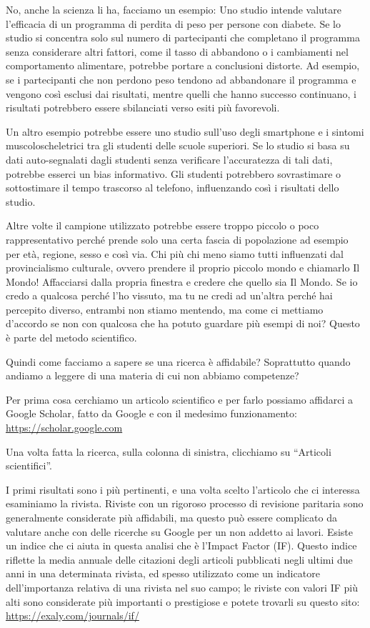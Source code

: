 \documentclass[12pt]{book} %
\begin{document}
No, anche la scienza li ha, facciamo un esempio: Uno studio intende valutare l'efficacia di un
programma di perdita di peso per persone con diabete. Se lo studio si concentra solo sul numero di partecipanti che
completano il programma senza considerare altri fattori, come il tasso di abbandono o i cambiamenti nel comportamento
alimentare, potrebbe portare a conclusioni distorte. Ad esempio, se i partecipanti che non perdono peso tendono ad
abbandonare il programma e vengono così esclusi dai risultati, mentre quelli che hanno successo continuano, i risultati
potrebbero essere sbilanciati verso esiti più favorevoli.

Un altro esempio potrebbe essere uno studio sull'uso degli smartphone e i sintomi
muscoloscheletrici tra gli studenti delle scuole superiori. Se lo studio si basa su dati auto-segnalati dagli studenti
senza verificare l'accuratezza di tali dati, potrebbe esserci un bias informativo. Gli studenti
potrebbero sovrastimare o sottostimare il tempo trascorso al telefono, influenzando così i risultati dello studio.

Altre volte il campione utilizzato potrebbe essere troppo piccolo o poco rappresentativo perché prende solo una certa fascia di popolazione ad esempio per età, regione, sesso e così via. Chi più chi meno siamo tutti influenzati dal provincialismo culturale, ovvero prendere il proprio piccolo mondo e chiamarlo Il Mondo! Affacciarsi dalla propria finestra e credere che quello sia Il Mondo. Se io credo a qualcosa perché l'ho vissuto, ma tu ne credi ad un'altra perché hai percepito diverso, entrambi non stiamo mentendo, ma come ci mettiamo d'accordo se non con qualcosa che ha potuto guardare più esempi di noi? Questo è parte del metodo scientifico.

Quindi come facciamo a sapere se una ricerca è affidabile? Soprattutto quando andiamo a leggere di una materia di cui
non abbiamo competenze?

Per prima cosa cerchiamo un articolo scientifico e per farlo possiamo affidarci a Google Scholar, fatto da Google e con
il medesimo funzionamento: \url{https://scholar.google.com}

Una volta fatta la ricerca, sulla colonna di sinistra, clicchiamo su “Articoli scientifici”.

I primi risultati sono i più pertinenti, e una volta scelto l'articolo che ci interessa esaminiamo
la rivista. Riviste con un rigoroso processo di revisione paritaria sono generalmente considerate più affidabili, ma
questo può essere complicato da valutare anche con delle ricerche su Google per un non addetto ai lavori. Esiste un
indice che ci aiuta in questa analisi che è l'Impact Factor (IF). Questo indice riflette la media
annuale delle citazioni degli articoli pubblicati negli ultimi due anni in una determinata rivista, ed spesso
utilizzato come un indicatore dell'importanza relativa di una rivista nel suo campo; le riviste
con valori IF più alti sono considerate più importanti o prestigiose e potete trovarli su questo sito: \url{https://exaly.com/journals/if/}
\end{document}
